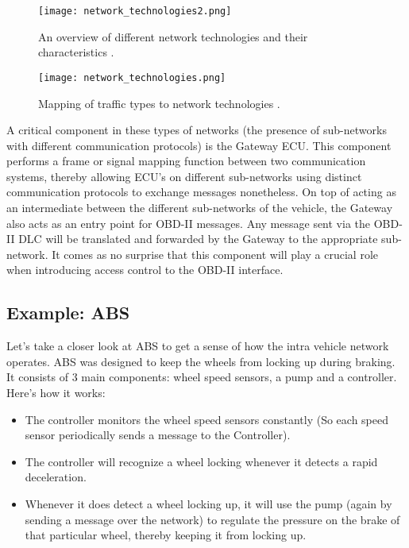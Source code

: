 \begin{figure}[h]
	\label{fig:network_technologies2}
	\centering
	\texttt{[image: network\_technologies2.png]}
	\caption{An overview of different network technologies and their characteristics \cite{Tuhoy}.}
\end{figure}

\begin{figure}[h]
	\label{fig:network_technologies}
	\centering
	\texttt{[image: network\_technologies.png]}
	\caption{Mapping of traffic types to network technologies \cite{Tuhoy}.}
\end{figure}

A critical component in these types of networks (the presence of sub-networks with different communication protocols) is the Gateway ECU. This component performs a frame or signal mapping function between two communication systems, thereby allowing ECU's on different sub-networks using distinct communication protocols to exchange messages nonetheless. 
On top of acting as an intermediate between the different sub-networks of the vehicle, the Gateway also acts as an entry point for OBD-II messages. Any message sent via the OBD-II DLC will be translated and forwarded by the Gateway to the appropriate sub-network. It comes as no surprise that this component will play a crucial role when introducing access control to the OBD-II interface.

\subsection{Example: ABS}
Let's take a closer look at ABS to get a sense of how the intra vehicle network operates. ABS was designed to keep the wheels from locking up during braking. It consists of 3 main components: wheel speed sensors, a pump and a controller. Here's how it works\cite{wiki:ABS}:

\begin{itemize}
	\item The controller monitors the wheel speed sensors constantly (So each speed sensor periodically sends a message to the Controller).
	
	\item The controller will recognize a wheel locking whenever it detects a rapid deceleration.
	
	\item Whenever it does detect a wheel locking up, it will use the pump (again by sending a message over the network) to regulate the pressure on the brake of that particular wheel, thereby keeping it from locking up.
\end{itemize}

